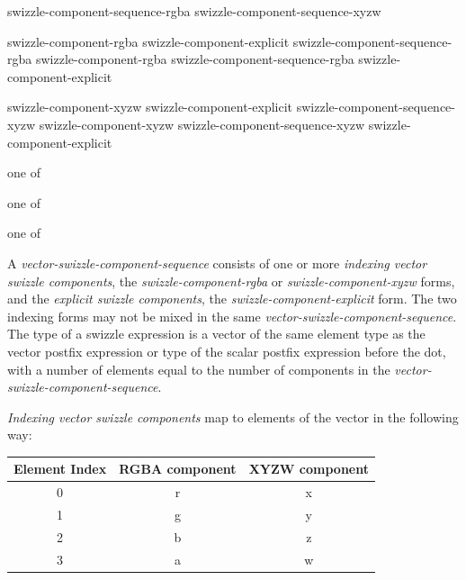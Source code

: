 
\begin{grammar}
  \br
  swizzle-component-sequence-rgba\br
  swizzle-component-sequence-xyzw\br

  \br
  swizzle-component-rgba\br
  swizzle-component-explicit\br
  swizzle-component-sequence-rgba swizzle-component-rgba\br
  swizzle-component-sequence-rgba swizzle-component-explicit\br

  \br
  swizzle-component-xyzw\br
  swizzle-component-explicit\br
  swizzle-component-sequence-xyzw swizzle-component-xyzw\br
  swizzle-component-sequence-xyzw swizzle-component-explicit\br

   \textnormal{one of}\br
  \br

   \textnormal{one of}\br
  \br

   \textnormal{one of}\br
\end{grammar}

\p A \textit{vector-swizzle-component-sequence} consists of one or more
\textit{indexing vector swizzle components}, the \textit{swizzle-component-rgba}
or \textit{swizzle-component-xyzw} forms, and the
\textit{explicit swizzle components}, the \textit{swizzle-component-explicit}
form. The two indexing forms may not be mixed in the same
\textit{vector-swizzle-component-sequence}. The type of a swizzle expression is
a vector of the same element type as the vector postfix expression or type of
the scalar postfix expression before the dot, with a number of elements equal to
the number of components in the \textit{vector-swizzle-component-sequence}.

\p \textit{Indexing vector swizzle components} map to elements of the vector in
the following way:

\begin{center}
  \begin{tabular}{|| c | c | c ||}
    \hline
    Element Index & RGBA component & XYZW component \\
    \hline
    0 & r & x \\
    1 & g & y \\
    2 & b & z \\
    3 & a & w \\
    \hline
  \end{tabular}
\end{center}

